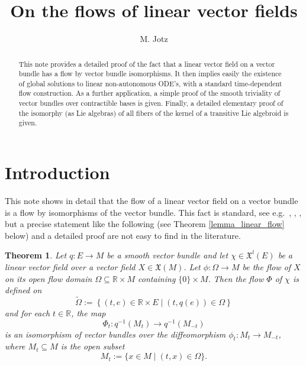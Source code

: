 \documentclass{amsart}
\theoremstyle{plain}
\newtheorem{thm*}[]{Theorem}
\newcommand{\R}{\mathbb{R}}
\newcommand{\inv}{^{-1}}
\newcommand{\mx}{\mathfrak{X}}
\begin{document}
\title{On the flows of linear vector fields}





\author{M. Jotz} \address{Institut f\"ur Mathematik,
Julius-Maximilians-Universit\"at W\"urzburg, Germany}

\begin{abstract}
This note provides a detailed proof of the fact that a linear vector field on a vector bundle has a flow by vector bundle isomorphisms. 
It then implies easily the existence of global solutions to linear non-autonomous ODE's, with a standard time-dependent flow construction. As a further application, a simple proof of the smooth triviality of vector bundles over contractible bases is given. Finally, a detailed elementary proof of the isomorphy (as Lie algebras) of all fibers of the kernel of a transitive Lie algebroid is given.
 \end{abstract}
\maketitle

\tableofcontents



\section{Introduction}
This note shows in detail that the flow  of a linear vector field on a vector bundle is a flow by isomorphisms of the vector bundle.
This fact is standard, see e.g.~\cite[Proposition 3.4.2]{Mackenzie05}, \cite[Proposition 2.2]{MaXU98}, \cite[Proposition 6.1]{Kosmann16},
but a precise statement like the following (see Theorem \ref{lemma_linear_flow} below) and a detailed proof are not easy to find in the literature.  
\begin{thm*}\label{lemma_linear_flow_intro}
Let $q\colon E\to M$ be a smooth vector bundle and let 
$\chi\in\mx^l(E)$ be a linear vector field 
over a vector field $X\in\mx(M)$. Let $\phi\colon \Omega\to M$ be the flow of $X$ on its open flow domain $\Omega\subseteq \R\times M$ containing $\{0\}\times M$. Then the flow $\Phi$ of $\chi$
is defined on 
\[ \widetilde\Omega:=\left\{ (t, e)\in \R\times E \mid (t,q(e))\in \Omega
\right\}
\]
and for each $t\in\R$, the map
\[ \Phi_t\colon q\inv(M_t)\to q\inv(M_{-t})
\]
is an isomorphism of vector bundles over the diffeomorphism $\phi_t\colon M_t\to M_{-t}$, where 
$M_t\subseteq M$ is the open subset
\[ M_t:=\{x\in M\mid (t,x)\in\Omega\}.
\]
\end{thm*}
\end{document}
